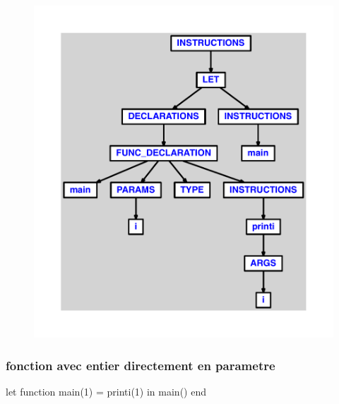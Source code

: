 \documentclass{article}
\begin{document}
\begin{figure}[H]\centering\includegraphics[max width=\textwidth]{ast/ast_218.pdf}\end{figure}\subsubsection{fonction avec entier directement en parametre}
\begin{verbatimtab}
let
	function main(1) = printi(1)
in main() end
\end{verbatimtab}
\end{document}
